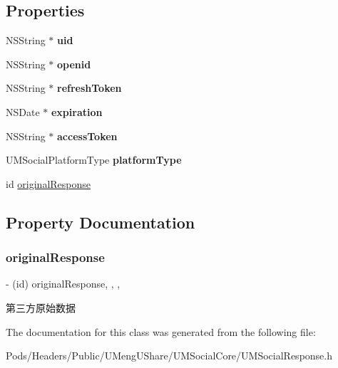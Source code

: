\subsection*{Properties}
\begin{DoxyCompactItemize}
\item 
\mbox{\label{interface_u_m_social_response_aa15f727575e70ad0bec0e59be5ef2059}} 
N\+S\+String $\ast$ {\bfseries uid}
\item 
\mbox{\label{interface_u_m_social_response_af4eddb3a34424f70e538d676c4901086}} 
N\+S\+String $\ast$ {\bfseries openid}
\item 
\mbox{\label{interface_u_m_social_response_a6db8fe9ac99e2eb97849ee7348ecc235}} 
N\+S\+String $\ast$ {\bfseries refresh\+Token}
\item 
\mbox{\label{interface_u_m_social_response_a4728faec8af1ccf1a4ee69e02e78f02f}} 
N\+S\+Date $\ast$ {\bfseries expiration}
\item 
\mbox{\label{interface_u_m_social_response_a112b46a3ae2bb2400f7fda1808330aae}} 
N\+S\+String $\ast$ {\bfseries access\+Token}
\item 
\mbox{\label{interface_u_m_social_response_acbc45ab3246199a282ffe5c1767b4ae0}} 
U\+M\+Social\+Platform\+Type {\bfseries platform\+Type}
\item 
id \mbox{\hyperlink{interface_u_m_social_response_a3e3744657f2d085bea770e63bd2b3087}{original\+Response}}
\end{DoxyCompactItemize}


\subsection{Property Documentation}
\mbox{\label{interface_u_m_social_response_a3e3744657f2d085bea770e63bd2b3087}} 
\subsubsection{\texorpdfstring{original\+Response}{originalResponse}}
{\footnotesize\ttfamily -\/ (id) original\+Response\hspace{0.3cm}{\ttfamily [read]}, {\ttfamily [write]}, {\ttfamily [nonatomic]}, {\ttfamily [strong]}}

第三方原始数据 

The documentation for this class was generated from the following file\+:\begin{DoxyCompactItemize}
\item 
Pods/\+Headers/\+Public/\+U\+Meng\+U\+Share/\+U\+M\+Social\+Core/U\+M\+Social\+Response.\+h\end{DoxyCompactItemize}
